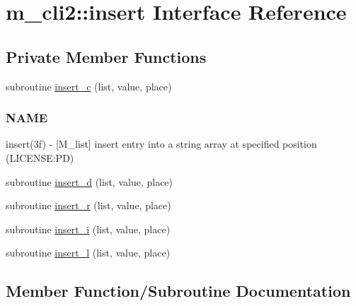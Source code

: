 \hypertarget{interfacem__cli2_1_1insert}{}\section{m\+\_\+cli2\+:\+:insert Interface Reference}
\label{interfacem__cli2_1_1insert}
\subsection*{Private Member Functions}
\begin{DoxyCompactItemize}
\item 
subroutine \mbox{\hyperlink{interfacem__cli2_1_1insert_af1a1ef419e4e9d4653fce92182e0e0c2}{insert\+\_\+c}} (list, value, place)
\begin{DoxyCompactList}\small\item\em \subsubsection*{N\+A\+ME}

insert(3f) -\/ \mbox{[}M\+\_\+list\mbox{]} insert entry into a string array at specified position (L\+I\+C\+E\+N\+SE\+:PD) \end{DoxyCompactList}\item 
subroutine \mbox{\hyperlink{interfacem__cli2_1_1insert_afbcad9e7123fdec1b5c996adc6076a26}{insert\+\_\+d}} (list, value, place)
\item 
subroutine \mbox{\hyperlink{interfacem__cli2_1_1insert_a647342bf6669248878fd990a9d92ef2e}{insert\+\_\+r}} (list, value, place)
\item 
subroutine \mbox{\hyperlink{interfacem__cli2_1_1insert_a50fcaf89ea5907952b521845dd434835}{insert\+\_\+i}} (list, value, place)
\item 
subroutine \mbox{\hyperlink{interfacem__cli2_1_1insert_a48dedb7035fb157485c81de9fc245659}{insert\+\_\+l}} (list, value, place)
\end{DoxyCompactItemize}


\subsection{Member Function/\+Subroutine Documentation}
\mbox{\label{interfacem__cli2_1_1insert_af1a1ef419e4e9d4653fce92182e0e0c2}} 
